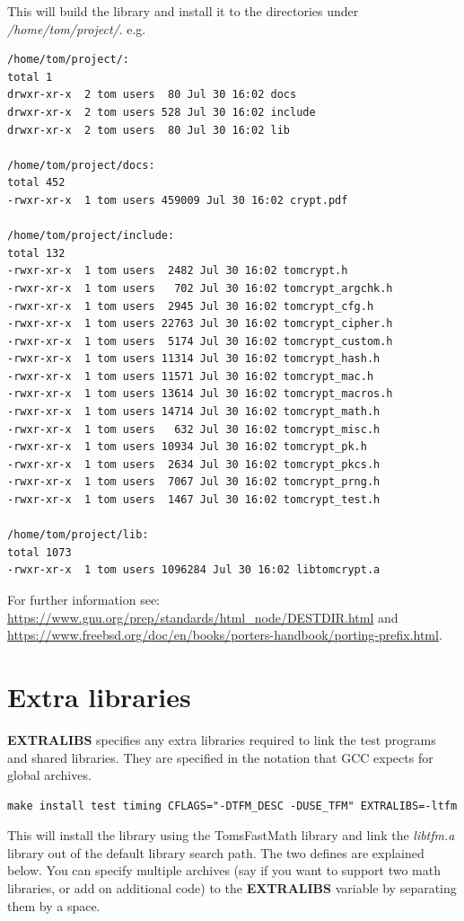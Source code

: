 \documentclass[synpaper]{book}
\newcommand{\mysection}[1]    %
	{                   %
	\section{#1}
   \markboth{\textsf{www.libtom.net}}{\thesection ~ {#1}}
	}
\begin{document}
This will build the library and install it to the directories under \textit{/home/tom/project/}.  e.g.

\begin{small}
\begin{verbatim}
/home/tom/project/:
total 1
drwxr-xr-x  2 tom users  80 Jul 30 16:02 docs
drwxr-xr-x  2 tom users 528 Jul 30 16:02 include
drwxr-xr-x  2 tom users  80 Jul 30 16:02 lib

/home/tom/project/docs:
total 452
-rwxr-xr-x  1 tom users 459009 Jul 30 16:02 crypt.pdf

/home/tom/project/include:
total 132
-rwxr-xr-x  1 tom users  2482 Jul 30 16:02 tomcrypt.h
-rwxr-xr-x  1 tom users   702 Jul 30 16:02 tomcrypt_argchk.h
-rwxr-xr-x  1 tom users  2945 Jul 30 16:02 tomcrypt_cfg.h
-rwxr-xr-x  1 tom users 22763 Jul 30 16:02 tomcrypt_cipher.h
-rwxr-xr-x  1 tom users  5174 Jul 30 16:02 tomcrypt_custom.h
-rwxr-xr-x  1 tom users 11314 Jul 30 16:02 tomcrypt_hash.h
-rwxr-xr-x  1 tom users 11571 Jul 30 16:02 tomcrypt_mac.h
-rwxr-xr-x  1 tom users 13614 Jul 30 16:02 tomcrypt_macros.h
-rwxr-xr-x  1 tom users 14714 Jul 30 16:02 tomcrypt_math.h
-rwxr-xr-x  1 tom users   632 Jul 30 16:02 tomcrypt_misc.h
-rwxr-xr-x  1 tom users 10934 Jul 30 16:02 tomcrypt_pk.h
-rwxr-xr-x  1 tom users  2634 Jul 30 16:02 tomcrypt_pkcs.h
-rwxr-xr-x  1 tom users  7067 Jul 30 16:02 tomcrypt_prng.h
-rwxr-xr-x  1 tom users  1467 Jul 30 16:02 tomcrypt_test.h

/home/tom/project/lib:
total 1073
-rwxr-xr-x  1 tom users 1096284 Jul 30 16:02 libtomcrypt.a
\end{verbatim}
\end{small}

For further information see: \url{https://www.gnu.org/prep/standards/html_node/DESTDIR.html}
and \url{https://www.freebsd.org/doc/en/books/porters-handbook/porting-prefix.html}.

\mysection{Extra libraries}
\textbf{EXTRALIBS} specifies any extra libraries required to link the test programs and shared libraries.  They are specified in the notation
that GCC expects for global archives.

\begin{verbatim}
make install test timing CFLAGS="-DTFM_DESC -DUSE_TFM" EXTRALIBS=-ltfm
\end{verbatim}

This will install the library using the TomsFastMath library and link the \textit{libtfm.a} library out of the default library search path.  The two
defines are explained below.  You can specify multiple archives (say if you want to support two math libraries, or add on additional code) to
the \textbf{EXTRALIBS} variable by separating them by a space.
\end{document}
